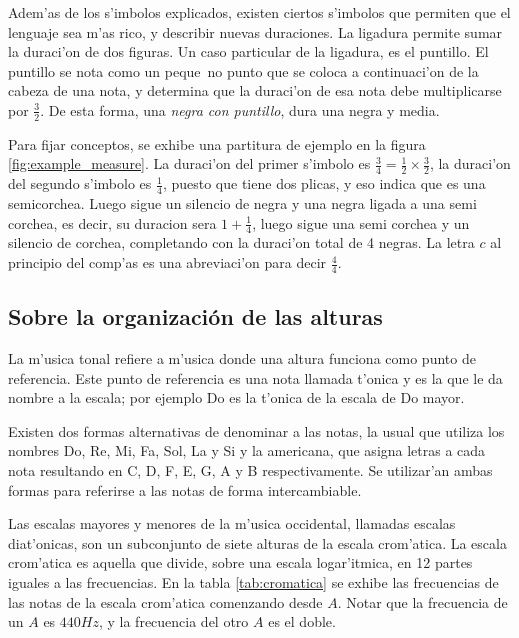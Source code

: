Adem'as de los s'imbolos explicados, existen ciertos s'imbolos que permiten que el lenguaje sea m'as rico, y describir nuevas duraciones. La ligadura
permite sumar la duraci'on de dos figuras. Un caso particular de la ligadura, es el puntillo. El puntillo se nota como un peque~no punto que se coloca a 
continuaci'on de la cabeza de una nota, y determina que la duraci'on de esa nota debe multiplicarse por $\frac{3}{2}$. 
De esta forma, una \emph{negra con puntillo}, dura una negra y media. 

Para fijar conceptos, se exhibe una partitura de ejemplo en la figura \ref{fig:example_measure}. 
La duraci'on del primer s'imbolo es $\frac{3}{4}=\frac{1}{2}\times\frac{3}{2}$,
la duraci'on del segundo s'imbolo es $\frac{1}{4}$, puesto que tiene dos plicas, y eso indica que es una semicorchea. Luego sigue un silencio de negra
y una negra ligada a una semi corchea, es decir, su duracion sera $1 + \frac{1}{4}$, luego sigue una semi corchea y un silencio de corchea, completando
con la duraci'on total de 4 negras. La letra $c$ al principio del comp'as es una abreviaci'on para decir $\frac{4}{4}$.

\begin{imagen}
    \width{12.5cm}
\end{imagen}

\subsection{Sobre la organizaci\'on de las alturas}
La m'usica tonal refiere a m'usica donde una altura funciona como punto de referencia. Este punto de referencia es una nota llamada t'onica y es
la que le da nombre a la escala; por ejemplo Do es la t'onica de la escala de Do mayor. 

Existen dos formas alternativas de denominar a las notas, la usual que utiliza los nombres Do, Re, Mi, Fa, Sol, La y Si y la americana, que 
asigna letras a cada nota resultando en C, D, F, E, G, A y B respectivamente. Se utilizar'an ambas formas para referirse a las notas de forma
intercambiable. 

Las escalas mayores y menores de la m'usica occidental, llamadas escalas diat'onicas, 
son un subconjunto de siete alturas de la escala crom'atica.
La escala crom'atica es aquella que divide, sobre una escala logar'itmica, en 12 partes iguales a las frecuencias.
En la tabla \ref{tab:cromatica} se exhibe las frecuencias de las notas de la escala crom'atica 
comenzando desde $A$. Notar que la frecuencia de un $A$ es $440Hz$, y la frecuencia del otro $A$ es el doble.

